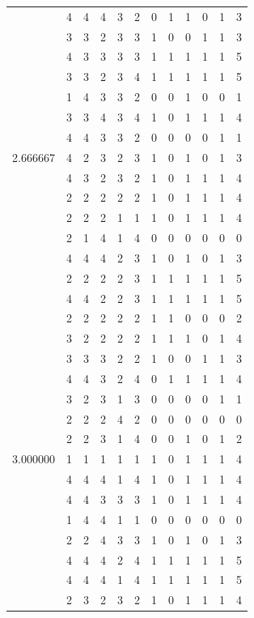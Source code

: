 \documentclass[]{book}
\theoremstyle{definition}
\theoremstyle{definition}
\theoremstyle{definition}
\theoremstyle{remark}
\begin{document}
\begin{table}
{\begin{tabular}[t]{rrrrrrrrrrrr}
 & 4 & 4 & 4 & 3 & 2 & 0 & 1 & 1 & 0 & 1 & 3\\
 & 3 & 3 & 2 & 3 & 3 & 1 & 0 & 0 & 1 & 1 & 3\\
 & 4 & 3 & 3 & 3 & 3 & 1 & 1 & 1 & 1 & 1 & 5\\
 & 3 & 3 & 2 & 3 & 4 & 1 & 1 & 1 & 1 & 1 & 5\\
 & 1 & 4 & 3 & 3 & 2 & 0 & 0 & 1 & 0 & 0 & 1\\
 & 3 & 3 & 4 & 3 & 4 & 1 & 0 & 1 & 1 & 1 & 4\\
 & 4 & 4 & 3 & 3 & 2 & 0 & 0 & 0 & 0 & 1 & 1\\
2.666667 & 4 & 2 & 3 & 2 & 3 & 1 & 0 & 1 & 0 & 1 & 3\\
 & 4 & 3 & 2 & 3 & 2 & 1 & 0 & 1 & 1 & 1 & 4\\
 & 2 & 2 & 2 & 2 & 2 & 1 & 0 & 1 & 1 & 1 & 4\\
 & 2 & 2 & 2 & 1 & 1 & 1 & 0 & 1 & 1 & 1 & 4\\
 & 2 & 1 & 4 & 1 & 4 & 0 & 0 & 0 & 0 & 0 & 0\\
 & 4 & 4 & 4 & 2 & 3 & 1 & 0 & 1 & 0 & 1 & 3\\
 & 2 & 2 & 2 & 2 & 3 & 1 & 1 & 1 & 1 & 1 & 5\\
 & 4 & 4 & 2 & 2 & 3 & 1 & 1 & 1 & 1 & 1 & 5\\
 & 2 & 2 & 2 & 2 & 2 & 1 & 1 & 0 & 0 & 0 & 2\\
 & 3 & 2 & 2 & 2 & 2 & 1 & 1 & 1 & 0 & 1 & 4\\
 & 3 & 3 & 3 & 2 & 2 & 1 & 0 & 0 & 1 & 1 & 3\\
 & 4 & 4 & 3 & 2 & 4 & 0 & 1 & 1 & 1 & 1 & 4\\
 & 3 & 2 & 3 & 1 & 3 & 0 & 0 & 0 & 0 & 1 & 1\\
 & 2 & 2 & 2 & 4 & 2 & 0 & 0 & 0 & 0 & 0 & 0\\
 & 2 & 2 & 3 & 1 & 4 & 0 & 0 & 1 & 0 & 1 & 2\\
3.000000 & 1 & 1 & 1 & 1 & 1 & 1 & 0 & 1 & 1 & 1 & 4\\
 & 4 & 4 & 4 & 1 & 4 & 1 & 0 & 1 & 1 & 1 & 4\\
 & 4 & 4 & 3 & 3 & 3 & 1 & 0 & 1 & 1 & 1 & 4\\
 & 1 & 4 & 4 & 1 & 1 & 0 & 0 & 0 & 0 & 0 & 0\\
 & 2 & 2 & 4 & 3 & 3 & 1 & 0 & 1 & 0 & 1 & 3\\
 & 4 & 4 & 4 & 2 & 4 & 1 & 1 & 1 & 1 & 1 & 5\\
 & 4 & 4 & 4 & 1 & 4 & 1 & 1 & 1 & 1 & 1 & 5\\
 & 2 & 3 & 2 & 3 & 2 & 1 & 0 & 1 & 1 & 1 & 4\\

\end{tabular}}
\end{table}
\end{document}
